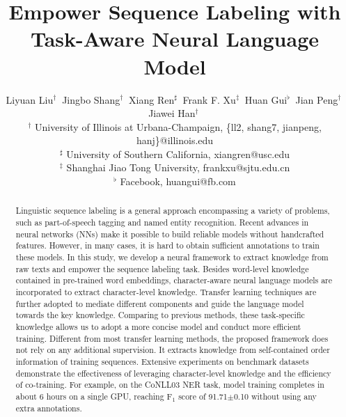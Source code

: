 \documentclass[letterpaper]{article} \usepackage{aaai18}  \usepackage{times}  \usepackage{helvet}  \usepackage{courier}  \usepackage{url}  \usepackage{graphicx}  \usepackage{multirow}
\begin{document}
\title{Empower Sequence Labeling with Task-Aware Neural Language Model}


\author{
Liyuan Liu$^{\dag}~$
Jingbo Shang$^{\dag}~$
Xiang Ren$^{\sharp}~$ 
Frank F. Xu$^{\ddag}~$
Huan Gui$^{\flat}~$
Jian Peng$^{\dag}~$
Jiawei Han$^{\dag}~$
\\[0.5ex]
{$^{\dag}$ University of Illinois at Urbana-Champaign, \{ll2, shang7, jianpeng, hanj\}@illinois.edu}\\
{$^{\sharp}$ University of Southern California, xiangren@usc.edu} \\
{$^{\ddag}$ Shanghai Jiao Tong University, frankxu@sjtu.edu.cn}\\
{$^{\flat}$ Facebook, huangui@fb.com}
}

\maketitle

\begin{abstract}

Linguistic sequence labeling is a general approach encompassing a variety of problems, such as part-of-speech tagging and named entity recognition.
Recent advances in neural networks (NNs) make it possible to build reliable models without handcrafted features.
However, in many cases, it is hard to obtain sufficient annotations to train these models.
In this study, we develop a neural framework to extract knowledge from raw texts and empower the sequence labeling task.
Besides word-level knowledge contained in pre-trained word embeddings, character-aware neural language models are incorporated to extract character-level knowledge.
Transfer learning techniques are further adopted to mediate different components and guide the language model towards the key knowledge.
Comparing to previous methods, these task-specific knowledge allows us to adopt a more concise model and conduct more efficient training.
Different from most transfer learning methods, the proposed framework does not rely on any additional supervision.
It extracts knowledge from self-contained order information of training sequences.
Extensive experiments on benchmark datasets demonstrate the effectiveness of leveraging character-level knowledge and the efficiency of co-training.
For example, on the CoNLL03 NER task, model training completes in about 6 hours on a single GPU, reaching F$_1$ score of 91.71$\pm$0.10 without using any extra annotations.
\end{abstract} 
\end{document}
